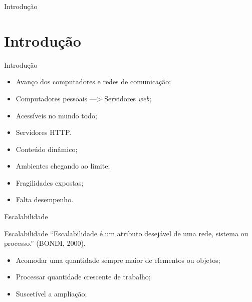 \begin{frame}
	\centering
	{\Huge Introdução}
\end{frame}

\section{Introdução}\label{sec:introducao}


\begin{frame}{Introdução}
	\begin{block}{}
		\begin{itemize}
			\item Avanço dos computadores e redes de comunicação;
			\item Computadores pessoais ---> Servidores \textit{web};
			\item Acessíveis no mundo todo;
			\item Servidores HTTP.
		\end{itemize}
	\end{block} \pause
	\begin{block}{}
		\begin{itemize}
			\item Conteúdo dinâmico;
			\item Ambientes chegando ao limite;
			\item Fragilidades expostas;
			\item Falta desempenho.
		\end{itemize}
	\end{block}
\end{frame}
\begin{frame}{Escalabilidade}
	\begin{block}{Escalabilidade}
		``Escalabilidade é um atributo desejável de 
		uma rede, sistema ou processo.'' (BONDI, 2000).
		\begin{itemize}
			\item Acomodar uma quantidade sempre maior de elementos ou objetos; 
			\pause
			\item Processar quantidade crescente de trabalho; \pause
			\item Suscetível a ampliação;
		\end{itemize}
	\end{block}
\end{frame}

